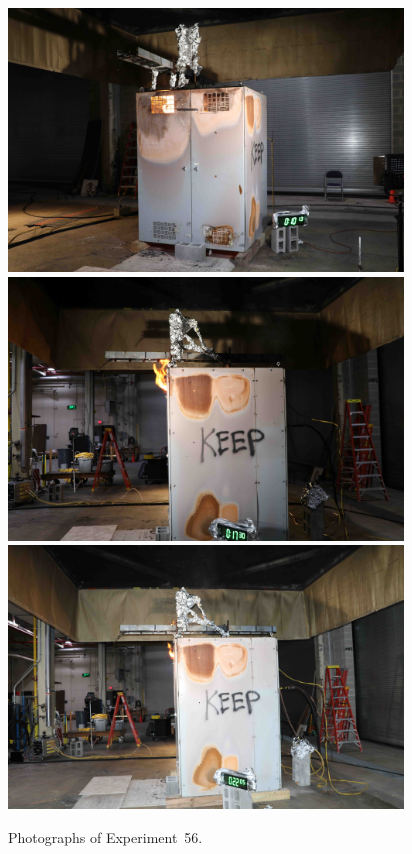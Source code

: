 \documentclass[12pt]{article}
\begin{document}
\begin{figure}[p]
\centering
\includegraphics[height=2.75in]{../FIGURES/Test_56_10_min_13_s} \\
\includegraphics[height=2.75in]{../FIGURES/Test_56_17_min_30_s} \\
\includegraphics[height=2.75in]{../FIGURES/Test_56_22_min_5_s}
\caption[Photographs of Experiment~56]{Photographs of Experiment~56.}
\label{fig:Test_56_photos}
\end{figure}


\clearpage
\end{document}
